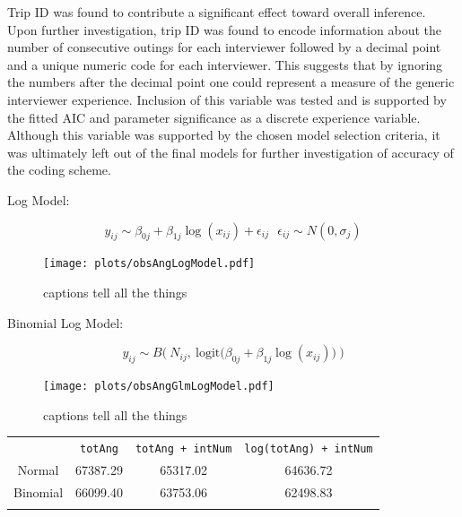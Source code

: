 \documentclass[12pt,]{article}
\begin{document}
Trip ID was found to contribute a significant effect toward overall
inference. Upon further investigation, trip ID was found to encode
information about the number of consecutive outings for each interviewer
followed by a decimal point and a unique numeric code for each
interviewer. This suggests that by ignoring the numbers after the
decimal point one could represent a measure of the generic interviewer
experience. Inclusion of this variable was tested and is supported by
the fitted AIC and parameter significance as a discrete experience
variable. Although this variable was supported by the chosen model
selection criteria, it was ultimately left out of the final models for
further investigation of accuracy of the coding scheme.

Log Model:

\begin{equation}
y_{ij} \sim \beta_{0j} + \beta_{1j} \log(x_{ij}) + \epsilon_{ij} ~~~ \epsilon_{ij} \sim N( 0, \sigma_j )
\end{equation}

\begin{figure}[htbp]
\centering
\texttt{[image: plots/obsAngLogModel.pdf]}
\caption{captions tell all the things \label{obsAngLogModel}}
\end{figure}

Binomial Log Model:

\begin{equation}
y_{ij} \sim B\Big( ~N_{ij}, ~\text{logit}\big(\beta_{0j} + \beta_{1j} \log(x_{ij})\big)~ \Big)
\end{equation}

\begin{figure}[htbp]
\centering
\texttt{[image: plots/obsAngGlmLogModel.pdf]}
\caption{captions tell all the things \label{obsAngLogModel}}
\end{figure}

\begin{longtable}[c]{@{}cccc@{}}
\toprule\addlinespace
& \verb|totAng| & \verb|totAng + intNum| & \verb|log(totAng) + intNum|
\\\addlinespace
\midrule\endhead
Normal & 67387.29 & 65317.02 & 64636.72
\\\addlinespace
Binomial & 66099.40 & 63753.06 & 62498.83
\\\addlinespace
\bottomrule
\end{longtable}
\end{document}
